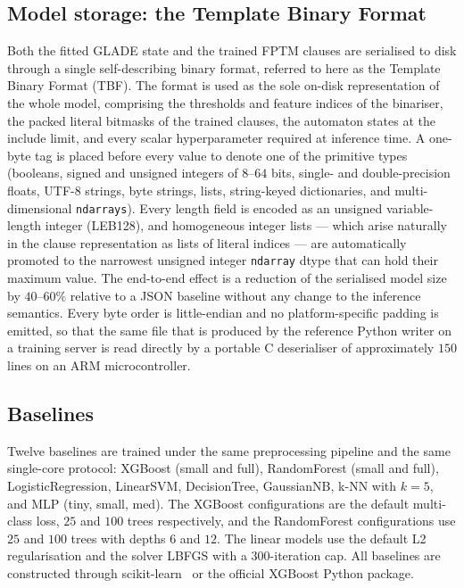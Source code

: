 \documentclass[journal,10pt]{IEEEtran}
\begin{document}
\subsection{Model storage: the Template Binary Format}
\label{sec:tbf}
Both the fitted GLADE state and the trained FPTM clauses are
serialised to disk through a single self-describing binary format,
referred to here as the Template Binary Format (TBF). The format is
used as the sole on-disk representation of the whole model,
comprising the thresholds and feature indices of the binariser, the
packed literal bitmasks of the trained clauses, the automaton states
at the include limit, and every scalar hyperparameter required at
inference time. A one-byte tag is placed before every value to
denote one of the primitive types (booleans, signed and unsigned
integers of $8$--$64$ bits, single- and double-precision floats,
UTF-8 strings, byte strings, lists, string-keyed dictionaries, and
multi-dimensional \texttt{ndarrays}). Every length field is encoded
as an unsigned variable-length integer (LEB128), and homogeneous
integer lists — which arise naturally in the clause representation
as lists of literal indices — are automatically promoted to the
narrowest unsigned integer \texttt{ndarray} dtype that can hold
their maximum value. The end-to-end effect is a reduction of the
serialised model size by $40$--$60\%$ relative to a JSON baseline
without any change to the inference semantics. Every byte order is
little-endian and no platform-specific padding is emitted, so that
the same file that is produced by the reference Python writer on a
training server is read directly by a portable C deserialiser of
approximately $150$ lines on an ARM microcontroller.

\subsection{Baselines}
Twelve baselines are trained under the same preprocessing pipeline
and the same single-core protocol: XGBoost (small and full),
RandomForest (small and full), LogisticRegression, LinearSVM,
DecisionTree, GaussianNB, k-NN with $k=5$, and MLP (tiny, small,
med). The XGBoost configurations are the default multi-class loss,
$25$ and $100$ trees respectively, and the RandomForest
configurations use $25$ and $100$ trees with depths $6$ and $12$. The
linear models use the default L2 regularisation and the solver
LBFGS with a $300$-iteration cap. All baselines are constructed
through scikit-learn~\cite{pedregosa2011scikit} or the official
XGBoost Python package.
\end{document}
